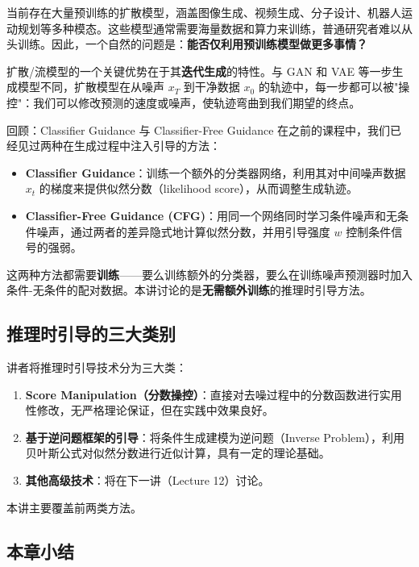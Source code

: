 \documentclass[a4paper]{article}
\begin{document}
当前存在大量预训练的扩散模型，涵盖图像生成、视频生成、分子设计、机器人运动规划等多种模态。这些模型通常需要海量数据和算力来训练，普通研究者难以从头训练。因此，一个自然的问题是：\textbf{能否仅利用预训练模型做更多事情？}

扩散/流模型的一个关键优势在于其\textbf{迭代生成}的特性。与 GAN 和 VAE 等一步生成模型不同，扩散模型在从噪声 $x_T$ 到干净数据 $x_0$ 的轨迹中，每一步都可以被"操控"：我们可以修改预测的速度或噪声，使轨迹弯曲到我们期望的终点。

\begin{knowledgebox}{回顾：Classifier Guidance 与 Classifier-Free Guidance}
在之前的课程中，我们已经见过两种在生成过程中注入引导的方法：
\begin{itemize}
    \item \textbf{Classifier Guidance}：训练一个额外的分类器网络，利用其对中间噪声数据 $x_t$ 的梯度来提供似然分数（likelihood score），从而调整生成轨迹。
    \item \textbf{Classifier-Free Guidance (CFG)}：用同一个网络同时学习条件噪声和无条件噪声，通过两者的差异隐式地计算似然分数，并用引导强度 $w$ 控制条件信号的强弱。
\end{itemize}
这两种方法都需要\textbf{训练}——要么训练额外的分类器，要么在训练噪声预测器时加入条件-无条件的配对数据。本讲讨论的是\textbf{无需额外训练}的推理时引导方法。
\end{knowledgebox}

\subsection{推理时引导的三大类别}

讲者将推理时引导技术分为三大类：

\begin{enumerate}
    \item \textbf{Score Manipulation（分数操控）}：直接对去噪过程中的分数函数进行实用性修改，无严格理论保证，但在实践中效果良好。
    \item \textbf{基于逆问题框架的引导}：将条件生成建模为逆问题（Inverse Problem），利用贝叶斯公式对似然分数进行近似计算，具有一定的理论基础。
    \item \textbf{其他高级技术}：将在下一讲（Lecture 12）讨论。
\end{enumerate}

本讲主要覆盖前两类方法。

\subsection{本章小结}
\end{document}
